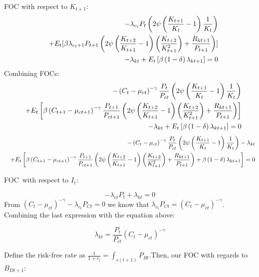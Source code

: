 \documentclass{article}
\begin{document}
FOC with respect to $K_{t+1}:$%
\begin{eqnarray}
&&-\lambda _{c_{t}}P_{t}\left( 2\psi \left( \frac{K_{t+1}}{K_{t}}-1\right) 
\frac{1}{K_{t}}\right)  \nonumber \\
&&+E_{t}[\beta \lambda _{c_{t}+1}P_{t+1}\left( 2\psi \left( \frac{K_{t+2}}{%
K_{t+1}}-1\right) \left( \frac{K_{t+2}}{K_{t+1}^{2}}\right) +\frac{R_{kt+1}}{%
P_{t+1}}\right) ]  \nonumber \\
&&-\lambda _{kt}+E_{t}\left[ \beta \left( 1-\delta \right) \lambda _{kt+1}%
\right] =0
\end{eqnarray}%
Combining FOCs: 
\begin{eqnarray}
&&-\left( C_{t}-\mu _{ct}\right) ^{-\gamma }\frac{P_{t}}{P_{ct}}\left( 2\psi
\left( \frac{K_{t+1}}{K_{t}}-1\right) \frac{1}{K_{t}}\right)  \nonumber \\
&&+E_{t}\left[ \beta \left( C_{t+1}-\mu _{ct+1}\right) ^{-\gamma }\frac{%
P_{t+1}}{P_{ct+1}}\left( 2\psi \left( \frac{K_{t+2}}{K_{t+1}}-1\right)
\left( \frac{K_{t+2}}{K_{t+1}^{2}}\right) +\frac{R_{kt+1}}{P_{t+1}}\right) %
\right]  \nonumber \\
&&-\lambda _{kt}+E_{t}\left[ \beta \left( 1-\delta \right) \lambda _{kt+1}%
\right] =0
\end{eqnarray}%
\begin{eqnarray}
&&-\left( C_{t}-\mu _{ct}\right) ^{-\gamma }\frac{P_{t}}{P_{ct}}\left( 2\psi
\left( \frac{K_{t+1}}{K_{t}}-1\right) \frac{1}{K_{t}}\right) -\lambda _{kt} 
\nonumber \\
&&+E_{t}\left[ \beta \left( C_{t+1}-\mu _{ct+1}\right) ^{-\gamma }\frac{%
P_{t+1}}{P_{ct+1}}\left( 2\psi \left( \frac{K_{t+2}}{K_{t+1}}-1\right)
\left( \frac{K_{t+2}}{K_{t+1}^{2}}\right) +\frac{R_{kt+1}}{P_{t+1}}\right)
+\beta \left( 1-\delta \right) \lambda _{kt+1}\right] =0
\end{eqnarray}

FOC\ with respect to $I_{t}:$

\bigskip

\[
-\lambda _{ct}P_{t}+\lambda _{kt}=0 
\]%
From $(C_{t}-\mu _{ct})^{-\gamma }-\lambda _{c_{t}}P_{Ct}=0$ we know that $%
\lambda _{c_{t}}P_{Ct}=(C_{t}-\mu _{ct})^{-\gamma }$. Combining the last
expression with the equation above:

\[
\lambda _{kt}=\frac{P_{t}}{P_{ct}}(C_{t}-\mu _{ct})^{-\gamma } 
\]

\bigskip

\bigskip Define the risk-free rate as $\frac{1}{1+r_{t}}%
=\int_{s(t+1)}P_{Bt}. $Then, our FOC with regards to $B_{Dt+1}$:
\end{document}
